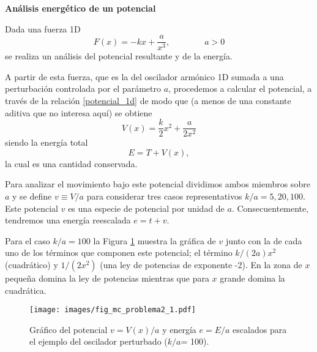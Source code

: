 \documentclass[10pt,oneside]{CBFT_book}
\begin{document}
\begin{ejemplo}{\bfseries Análisis energético de un potencial }

\label{ejemplo_analisis_potencial}
Dada una fuerza 1D 
\[
	F(x) = -k x + \frac{a}{x^3} ,	\qquad \qquad a > 0
\]
se realiza un análisis del potencial resultante y de la energía.


\vspace*{1mm}
A partir de esta fuerza, que es la del oscilador armónico 1D sumada a una perturbación controlada por el parámetro 
$a$, procedemos a calcular el potencial, a través de la relación \eqref{potencial_1d} de modo que (a menos de una 
constante aditiva que no interesa aquí) se obtiene
\[
	V(x) = \frac{k}{2} x^2 + \frac{a}{2 x^2}
\]
siendo la energía total 
\[
	E = T + V( x ), 
\]
la cual es una cantidad conservada.

Para analizar el movimiento bajo este potencial dividimos ambos miembros sobre $ a $ y se define $ v \equiv V/a$ para 
considerar tres casos representativos $ k / a = 5, 20, 100 $. Este potencial $ v $ es una especie de potencial por 
unidad de $ a $. Consecuentemente, tendremos una energía reescalada $ e = t + v $.

Para el caso $ k / a = 100 $ la Figura \ref{fig_mc_problema2_1} muestra la gráfica de $ v $ junto con la de cada 
uno de los términos que componen este potencial; el término $k/(2a) x^2$ (cuadrático) y $1/(2x^2)$ (una ley de potencias 
de exponente -2). En la zona de $ x $ pequeña domina la ley de potencias mientras que para $ x $ grande domina la 
cuadrática. 

\begin{figure}[!ht]
	\begin{center}
	\texttt{[image: images/fig\_mc\_problema2\_1.pdf]}	
	\end{center}
	\vspace*{-5mm}
	\caption{Gráfico del potencial $v=V(x)/a$ y energía $e=E/a$ escalados para el ejemplo del oscilador perturbado 
	($ k/a $= 100).}
	\label{fig_mc_problema2_1}
\end{figure} 


\end{ejemplo}
\end{document}
